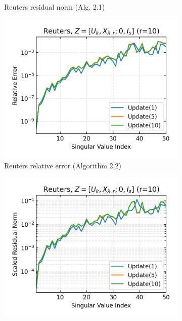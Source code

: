 \begin{figure}[H]
\begin{subfigure}[b]{0.48\textwidth}
    \caption{Reuters residual norm (Alg. 2.1)}
  \end{subfigure}
  \hfill
  \begin{subfigure}[b]{0.48\textwidth}
    \centering
    \includegraphics[width=\textwidth]{figures/reuters/Reuters_bcg_n_batches_10_k_dims_50_rval_10_rel_err.png}
    \caption{Reuters relative error (Algorithm 2.2)}
  \end{subfigure}
  \hfill
  \begin{subfigure}[b]{0.48\textwidth}
    \centering
    \includegraphics[width=\textwidth]{figures/reuters/Reuters_bcg_n_batches_10_k_dims_50_rval_10_res_norm.png}

\end{subfigure}
\end{figure}
